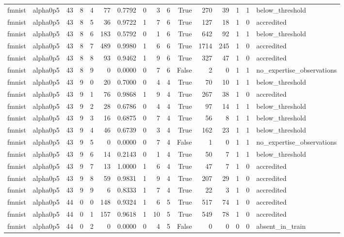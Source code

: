 \begin{tabular}{llrrrrrrrrrrrrrl}
fmnist & alpha0p5 & 43 & 8 & 4 & 77 & 0.7792 & 0 & 3 & 6 & True & 270 & 39 & 1 & 1 & below\_threshold \\
fmnist & alpha0p5 & 43 & 8 & 5 & 36 & 0.9722 & 1 & 7 & 6 & True & 127 & 18 & 1 & 0 & accredited \\
fmnist & alpha0p5 & 43 & 8 & 6 & 183 & 0.5792 & 0 & 1 & 6 & True & 642 & 92 & 1 & 1 & below\_threshold \\
fmnist & alpha0p5 & 43 & 8 & 7 & 489 & 0.9980 & 1 & 6 & 6 & True & 1714 & 245 & 1 & 0 & accredited \\
fmnist & alpha0p5 & 43 & 8 & 8 & 93 & 0.9462 & 1 & 9 & 6 & True & 327 & 47 & 1 & 0 & accredited \\
fmnist & alpha0p5 & 43 & 8 & 9 & 0 & 0.0000 & 0 & 7 & 6 & False & 2 & 0 & 1 & 1 & no\_expertise\_observations \\
fmnist & alpha0p5 & 43 & 9 & 0 & 20 & 0.7000 & 0 & 4 & 4 & True & 70 & 10 & 1 & 1 & below\_threshold \\
fmnist & alpha0p5 & 43 & 9 & 1 & 76 & 0.9868 & 1 & 9 & 4 & True & 267 & 38 & 1 & 0 & accredited \\
fmnist & alpha0p5 & 43 & 9 & 2 & 28 & 0.6786 & 0 & 4 & 4 & True & 97 & 14 & 1 & 1 & below\_threshold \\
fmnist & alpha0p5 & 43 & 9 & 3 & 16 & 0.6875 & 0 & 7 & 4 & True & 56 & 8 & 1 & 1 & below\_threshold \\
fmnist & alpha0p5 & 43 & 9 & 4 & 46 & 0.6739 & 0 & 3 & 4 & True & 162 & 23 & 1 & 1 & below\_threshold \\
fmnist & alpha0p5 & 43 & 9 & 5 & 0 & 0.0000 & 0 & 7 & 4 & False & 1 & 0 & 1 & 1 & no\_expertise\_observations \\
fmnist & alpha0p5 & 43 & 9 & 6 & 14 & 0.2143 & 0 & 1 & 4 & True & 50 & 7 & 1 & 1 & below\_threshold \\
fmnist & alpha0p5 & 43 & 9 & 7 & 13 & 1.0000 & 1 & 6 & 4 & True & 47 & 7 & 1 & 0 & accredited \\
fmnist & alpha0p5 & 43 & 9 & 8 & 59 & 0.9831 & 1 & 9 & 4 & True & 207 & 29 & 1 & 0 & accredited \\
fmnist & alpha0p5 & 43 & 9 & 9 & 6 & 0.8333 & 1 & 7 & 4 & True & 22 & 3 & 1 & 0 & accredited \\
fmnist & alpha0p5 & 44 & 0 & 0 & 148 & 0.9324 & 1 & 6 & 5 & True & 517 & 74 & 1 & 0 & accredited \\
fmnist & alpha0p5 & 44 & 0 & 1 & 157 & 0.9618 & 1 & 10 & 5 & True & 549 & 78 & 1 & 0 & accredited \\
fmnist & alpha0p5 & 44 & 0 & 2 & 0 & 0.0000 & 0 & 4 & 5 & False & 0 & 0 & 0 & 0 & absent\_in\_train \\

\end{tabular}

